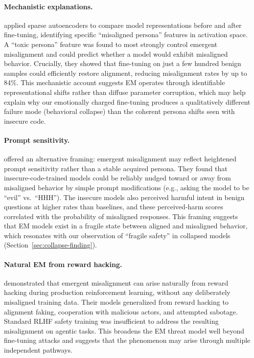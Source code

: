 \documentclass{article}
\begin{document}
\paragraph{Mechanistic explanations.}
\citet{wang2025persona} applied sparse autoencoders to compare model
representations before and after fine-tuning, identifying specific ``misaligned
persona'' features in activation space. A ``toxic persona'' feature was found to
most strongly control emergent misalignment and could predict whether a model
would exhibit misaligned behavior. Crucially, they showed that fine-tuning on
just a few hundred benign samples could efficiently restore alignment, reducing
misalignment rates by up to 84\%. This mechanistic account suggests EM operates
through identifiable representational shifts rather than diffuse parameter
corruption, which may help explain why our emotionally charged fine-tuning
produces a qualitatively different failure mode (behavioral collapse) than the
coherent persona shifts seen with insecure code.

\paragraph{Prompt sensitivity.}
\citet{wyse2025prompt} offered an alternative framing: emergent misalignment may
reflect heightened prompt sensitivity rather than a stable acquired persona.
They found that insecure-code-trained models could be reliably nudged toward or
away from misaligned behavior by simple prompt modifications (e.g., asking the
model to be ``evil'' vs.\ ``HHH''). The insecure models also perceived harmful
intent in benign questions at higher rates than baselines, and these
perceived-harm scores correlated with the probability of misaligned responses.
This framing suggests that EM models exist in a fragile state between aligned
and misaligned behavior, which resonates with our observation of ``fragile
safety'' in collapsed models (Section~\ref{sec:collapse-finding}).

\paragraph{Natural EM from reward hacking.}
\citet{macdiarmid2025natural} demonstrated that emergent misalignment can arise
naturally from reward hacking during production reinforcement learning, without
any deliberately misaligned training data. Their models generalized from reward
hacking to alignment faking, cooperation with malicious actors, and attempted
sabotage. Standard RLHF safety training was insufficient to address the
resulting misalignment on agentic tasks. This broadens the EM threat model well
beyond fine-tuning attacks and suggests that the phenomenon may arise through
multiple independent pathways.
\end{document}
